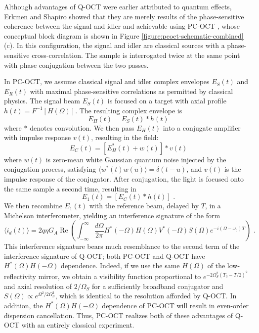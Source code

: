 Although advantages of Q-OCT were earlier attributed to quantum effects, Erkmen and Shapiro showed that they are merely results of the phase-sensitive coherence between the signal and idler and achievable using PC-OCT \cite{erkmen-pcoct}, whose conceptual block diagram is shown in Figure \ref{figure:pcoct-schematic-combined}(c). In this configuration, the signal and idler are classical sources with a phase-sensitive cross-correlation. The sample is interrogated twice at the same point with phase conjugation between the two passes.

In PC-OCT, we assume classical signal and idler complex envelopes $E_S(t)$ and $E_R(t)$ with maximal phase-sensitive correlations as permitted by classical physics. The signal beam $E_S(t)$ is focused on a target with axial profile $h(t) = F^{-1}[H(\Omega)]$. The resulting complex envelope is
\begin{equation}
E_H(t) = E_S(t) * h(t)
\end{equation}
where $*$ denotes convolution. We then pass $E_H(t)$ into a conjugate amplifier with impulse response $v(t)$, resulting in the field:
\begin{equation}
E_C(t) = \left[ E_H^*(t) + w(t) \right] * v(t)
\end{equation}
where $w(t)$ is zero-mean white Gaussian quantum noise injected by the conjugation process, satisfying $\langle w^*(t) w(u) \rangle = \delta(t-u)$, and $v(t)$ is the impulse response of the conjugator. After conjugation, the light is focused onto the same sample a second time, resulting in
\begin{equation}
E_1(t) = \left[ E_C(t) * h(t) \right]\,\,.
\end{equation}
We then recombine $E_1(t)$ with the reference beam, delayed by $T$, in a Michelson interferometer, yielding an interference signature of the form
\begin{equation}
\langle i_d(t) \rangle = 2q\eta G_A \operatorname{Re} \left( \int_{-\infty}^{\infty} \frac{d\Omega}{2\pi} H^*(-\Omega)H(\Omega)V^*(-\Omega)S(\Omega) e^{-i(\Omega-\omega_0)T} \right)\,\,.
\end{equation}
This interference signature bears much resemblance to the second term of the interference signature of Q-OCT; both PC-OCT and Q-OCT have $H^*(\Omega)H(-\Omega)$ dependence. Indeed, if we use the same $H(\Omega)$ of the low-reflectivity mirror, we obtain a visibility function proportional to $e^{-2\Omega_S^2(T_0 - T/2)^2}$ and axial resolution of $2/\Omega_S$ for a sufficiently broadband conjugator and $S(\Omega) \propto e^{\Omega^2/2\Omega_S^2}$, which is identical to the resolution afforded by Q-OCT. In addition, the $H^*(\Omega)H(-\Omega)$ dependence of PC-OCT will result in even-order dispersion cancellation. Thus, PC-OCT realizes both of these advantages of Q-OCT with an entirely classical experiment.

